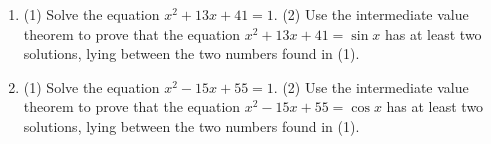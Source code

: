 \begin{enumerate}[ref={\fcProblemRef}]
\item \label{problemIVTtoshowx^2+13x+14=sinx-has-solutions} (1) Solve the equation $x^2+13x+41=1$.  (2) Use the intermediate value theorem to prove that the equation $x^2+13x+41=\sin  x$ has at least two solutions, lying between the two numbers found in (1).
\item (1) Solve the equation $x^2-15x+55=1$.  (2) Use the intermediate value theorem to prove that the equation $x^2-15x+55=\cos  x$ has at least two solutions, lying between the two numbers found in (1).
\end{enumerate}
